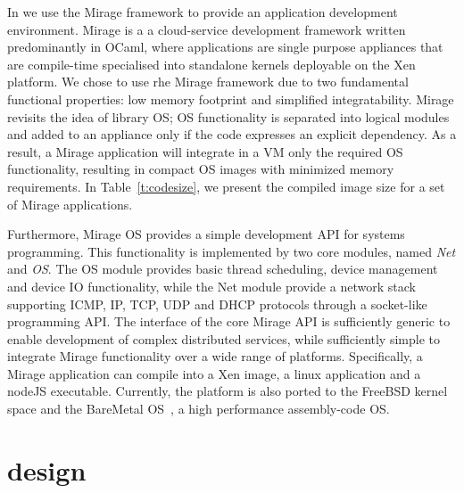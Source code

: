 
In \sdnsim we use the Mirage framework to provide an application development
environment. Mirage is a a cloud-service development framework written
predominantly in OCaml, where applications are single purpose appliances that
are compile-time specialised into standalone kernels deployable on the Xen
platform.  We chose to use rhe Mirage framework due to two fundamental
functional properties: low memory footprint and simplified integratability.
Mirage revisits the idea of library OS; OS functionality is separated into
logical modules and added to an appliance only if the code expresses an explicit
dependency.  As a result, a Mirage application will integrate in a VM only the
required OS functionality, resulting in compact OS images with minimized
memory requirements. In Table~\ref{t:codesize}, we present the compiled image
size for a set of Mirage applications.

Furthermore, Mirage OS provides a simple development API for systems
programming. This functionality is implemented by two core modules, named
\textit{Net} and \textit{OS}.  The OS module provides basic thread scheduling,
device management and device IO functionality, while the Net module provide a
network stack supporting ICMP, IP, TCP, UDP and DHCP protocols through a socket-like
programming API. The interface of the core Mirage API is sufficiently generic to
enable development of complex distributed services, while sufficiently simple to
integrate Mirage functionality over a wide range of platforms. Specifically, a
Mirage application can compile into a Xen image, a linux application and a
nodeJS executable. Currently, the platform is also ported to the FreeBSD kernel
space and the BareMetal OS~\cite{baremetalOS}, a high performance assembly-code
OS.

\section{\sdnsim design} \label{sec:sdnsim-design}

